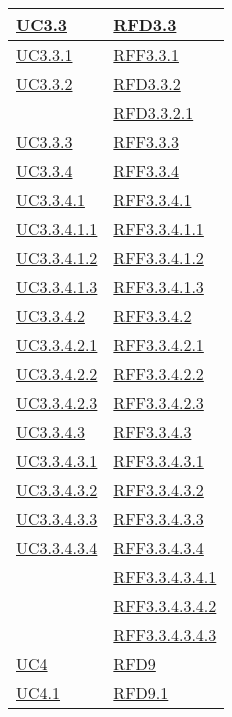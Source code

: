 \begin{longtable}{|>{\centering}m{5cm}|m{5cm}<{\centering}|}
\hyperref[UC3.3]{UC3.3} & \hyperlink{RFD3.3}{RFD3.3}\\ \hline
\hyperref[UC3.3.1]{UC3.3.1} & \hyperlink{RFF3.3.1}{RFF3.3.1}\\ \hline
\hyperref[UC3.3.2]{UC3.3.2} & \hyperlink{RFD3.3.2}{RFD3.3.2}\\
& \hyperlink{RFD3.3.2.1}{RFD3.3.2.1}\\ \hline
\hyperref[UC3.3.3]{UC3.3.3} & \hyperlink{RFF3.3.3}{RFF3.3.3}\\ \hline
\hyperref[UC3.3.4]{UC3.3.4} & \hyperlink{RFF3.3.4}{RFF3.3.4}\\ \hline
\hyperref[UC3.3.4.1]{UC3.3.4.1} & \hyperlink{RFF3.3.4.1}{RFF3.3.4.1}\\ \hline
\hyperref[UC3.3.4.1.1]{UC3.3.4.1.1} & \hyperlink{RFF3.3.4.1.1}{RFF3.3.4.1.1}\\ \hline
\hyperref[UC3.3.4.1.2]{UC3.3.4.1.2} & \hyperlink{RFF3.3.4.1.2}{RFF3.3.4.1.2}\\ \hline
\hyperref[UC3.3.4.1.3]{UC3.3.4.1.3} & \hyperlink{RFF3.3.4.1.3}{RFF3.3.4.1.3}\\ \hline
\hyperref[UC3.3.4.2]{UC3.3.4.2} & \hyperlink{RFF3.3.4.2}{RFF3.3.4.2}\\ \hline
\hyperref[UC3.3.4.2.1]{UC3.3.4.2.1} & \hyperlink{RFF3.3.4.2.1}{RFF3.3.4.2.1}\\ \hline
\hyperref[UC3.3.4.2.2]{UC3.3.4.2.2} & \hyperlink{RFF3.3.4.2.2}{RFF3.3.4.2.2}\\ \hline
\hyperref[UC3.3.4.2.3]{UC3.3.4.2.3} & \hyperlink{RFF3.3.4.2.3}{RFF3.3.4.2.3}\\ \hline
\hyperref[UC3.3.4.3]{UC3.3.4.3} & \hyperlink{RFF3.3.4.3}{RFF3.3.4.3}\\ \hline
\hyperref[UC3.3.4.3.1]{UC3.3.4.3.1} & \hyperlink{RFF3.3.4.3.1}{RFF3.3.4.3.1}\\ \hline
\hyperref[UC3.3.4.3.2]{UC3.3.4.3.2} & \hyperlink{RFF3.3.4.3.2}{RFF3.3.4.3.2}\\ \hline
\hyperref[UC3.3.4.3.3]{UC3.3.4.3.3} & \hyperlink{RFF3.3.4.3.3}{RFF3.3.4.3.3}\\ \hline
\hyperref[UC3.3.4.3.4]{UC3.3.4.3.4} & \hyperlink{RFF3.3.4.3.4}{RFF3.3.4.3.4}\\
& \hyperlink{RFF3.3.4.3.4.1}{RFF3.3.4.3.4.1}\\
& \hyperlink{RFF3.3.4.3.4.2}{RFF3.3.4.3.4.2}\\
& \hyperlink{RFF3.3.4.3.4.3}{RFF3.3.4.3.4.3}\\ \hline
\hyperref[UC4]{UC4} & \hyperlink{RFD9}{RFD9}\\ \hline
\hyperref[UC4.1]{UC4.1} & \hyperlink{RFD9.1}{RFD9.1}\\ \hline

\end{longtable}
